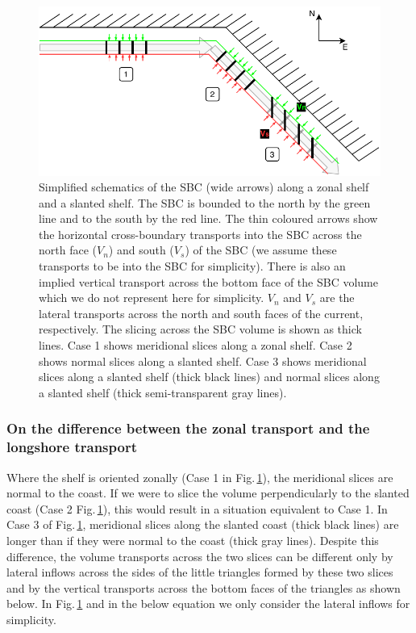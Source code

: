 \documentclass[preprint,3p,review,12pt]{elsarticle}
\begin{document}
\begin{figure}[hbp]
    \includegraphics[width=1\textwidth, height=1\textheight, keepaspectratio]{slices.pdf}
    \caption{\label{slices}%
    Simplified schematics of the SBC (wide arrows) along a zonal shelf and a slanted shelf. The SBC is bounded to the north by the green line and to the south by the red line. The thin coloured arrows show the horizontal cross-boundary transports into the SBC across the north face ($V_n$) and south ($V_s$) of the SBC (we assume these transports to be into the SBC for simplicity). There is also an implied vertical transport across the bottom face of the SBC volume which we do not represent here for simplicity. $V_n$ and $V_s$ are the lateral transports across the north and south faces of the current, respectively. The slicing across the SBC volume is shown as thick lines. Case 1 shows meridional slices along a zonal shelf. Case 2 shows normal slices along a slanted shelf. Case 3 shows meridional slices along a slanted shelf (thick black lines) and normal slices along a slanted shelf (thick semi-transparent gray lines).}
\end{figure}

\subsubsection{On the difference between the zonal transport and the longshore transport}

Where the shelf is oriented zonally (Case 1 in Fig.\,\ref{slices}), the meridional slices are normal to the coast. If we were to slice the volume perpendicularly to the slanted coast (Case 2 Fig.\,\ref{slices}), this would result in a situation equivalent to Case 1. In Case 3 of Fig.\,\ref{slices}, meridional slices along the slanted coast (thick black lines) are longer than if they were normal to the coast (thick gray lines). Despite this difference, the volume transports across the two slices can be different only by lateral inflows across the sides of the little triangles formed by these two slices and by the vertical transports across the bottom faces of the triangles as shown below. In Fig.\,\ref{slices} and in the below equation we only consider the lateral inflows for simplicity.
\end{document}
